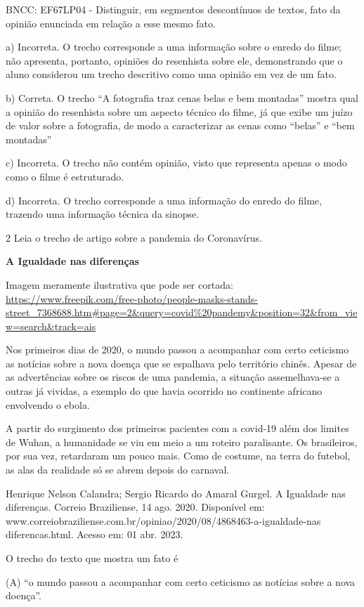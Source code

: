 \begin{itemize}
\begin{itemize}
{\begin{itemize}
\begin{itemize}
BNCC: EF67LP04 - Distinguir, em segmentos descontínuos de textos, fato
da opinião enunciada em relação a esse mesmo fato.

a) Incorreta. O trecho corresponde a uma informação sobre o enredo do
filme; não apresenta, portanto, opiniões do resenhista sobre ele,
demonstrando que o aluno considerou um trecho descritivo como uma
opinião em vez de um fato.

b) Correta. O trecho ``A fotografia traz cenas belas e bem montadas''
mostra qual a opinião do resenhista sobre um aspecto técnico do filme,
já que exibe um juízo de valor sobre a fotografia, de modo a
caracterizar as cenas como ``belas'' e ``bem montadas''

c) Incorreta. O trecho não contém opinião, visto que representa apenas o
modo como o filme é estruturado.

d) Incorreta. O trecho corresponde a uma informação do enredo do filme,
trazendo uma informação técnica da sinopse.

\num{2} Leia o trecho de artigo sobre a pandemia do Coronavírus.

\textbf{A Igualdade nas diferenças}

Imagem meramente ilustrativa que pode ser cortada:
\url{https://www.freepik.com/free-photo/people-masks-stands-street_7368688.htm\#page=2\&query=covid\%20pandemy\&position=32\&from_view=search\&track=ais}

Nos primeiros dias de 2020, o mundo passou a acompanhar com certo
ceticismo as notícias sobre a nova doença que se espalhava pelo
território chinês. Apesar de as advertências sobre os riscos de uma
pandemia, a situação assemelhava-se a outras já vividas, a exemplo do
que havia ocorrido no continente africano envolvendo o ebola.

A partir do surgimento dos primeiros pacientes com a covid-19 além dos
limites de Wuhan, a humanidade se viu em meio a um roteiro paralisante.
Os brasileiros, por sua vez, retardaram um pouco mais. Como de costume,
na terra do futebol, as alas da realidade só se abrem depois do
carnaval.

Henrique Nelson Calandra; Sergio Ricardo do Amaral Gurgel. A Igualdade
nas diferenças. Correio Braziliense, 14 ago. 2020. Disponível em:
www.correiobraziliense.com.br/opiniao/2020/08/4868463-a-igualdade-nas
diferencas.html. Acesso em: 01 abr. 2023.

O trecho do texto que mostra um fato é

(A) ``o mundo passou a acompanhar com certo ceticismo as notícias sobre
a nova doença''.


\end{itemize}
\end{itemize}}
\end{itemize}
\end{itemize}
